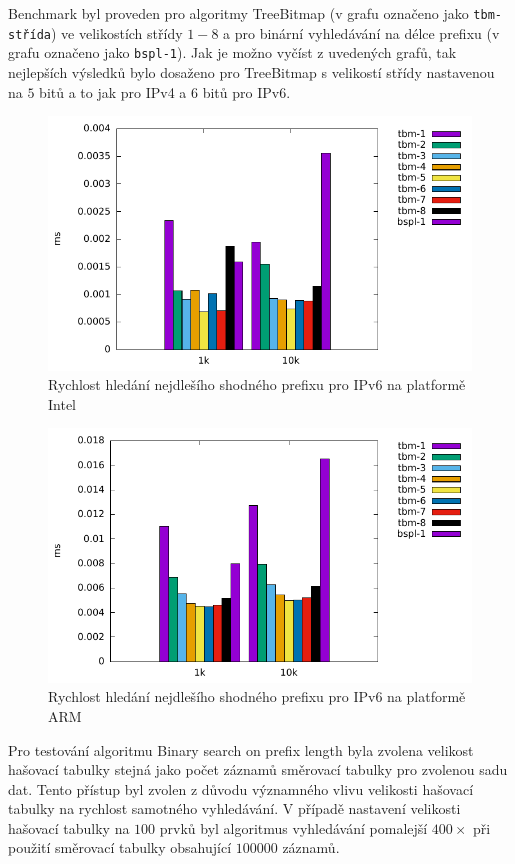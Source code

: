 Benchmark byl proveden pro algoritmy TreeBitmap (v grafu označeno jako \texttt{tbm-střída}) ve velikostích střídy $1-8$ a pro binární vyhledávání na délce prefixu (v grafu označeno jako \texttt{bspl-1}).
Jak je možno vyčíst z uvedených grafů, tak nejlepších výsledků bylo dosaženo pro TreeBitmap s velikostí
střídy nastavenou na $5$ bitů a to jak pro IPv4 a $6$ bitů pro IPv6.

\begin{figure}[!htbp]
	\centering
	\includegraphics[scale=1]{fig/lpm-ipv6.pdf}
	\caption{Rychlost hledání nejdlešího shodného prefixu pro IPv6 na platformě Intel}
    \label{fig:lpm-ipv6}
\end{figure}

\begin{figure}[!htbp]
    \centering
    \includegraphics[scale=1]{fig/lpm-ipv6-arm.pdf}
    \caption{Rychlost hledání nejdlešího shodného prefixu pro IPv6 na platformě ARM}
    \label{fig:lpm-ipv6-arm}
\end{figure}

Pro testování algoritmu Binary search on prefix length byla zvolena velikost hašovací tabulky
stejná jako počet záznamů směrovací tabulky pro zvolenou sadu dat. Tento přístup byl zvolen z důvodu významného vlivu
velikosti hašovací tabulky na rychlost samotného vyhledávání.
V případě nastavení velikosti hašovací tabulky na $100$ prvků byl algoritmus vyhledávání pomalejší $400\times$
při použití směrovací tabulky obsahující $100 000$ záznamů.


